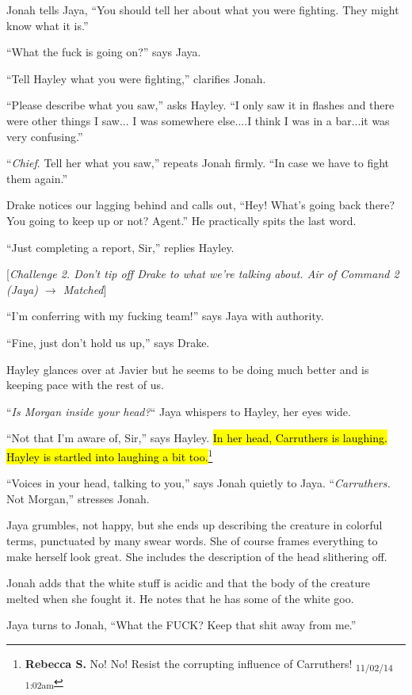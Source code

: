 Jonah tells Jaya, ``You should tell her about what you were fighting. They might know what it is.''

``What the fuck is going on?'' says Jaya.

``Tell Hayley what you were fighting,'' clarifies Jonah.

``Please describe what you saw,'' asks Hayley.  ``I only saw it in flashes and there were other things I saw... I was somewhere else....I think I was in a bar...it was very confusing.''

``\textit{Chief}.  Tell her what you saw,'' repeats Jonah firmly.  ``In case we have to fight them again.''

Drake notices our lagging behind and calls out, ``Hey! What's going back there?  You going to keep up or not?  Agent.''  He practically spits the last word.

``Just completing a report, Sir,'' replies Hayley.

{[}\textit{Challenge 2.  Don't tip off Drake to what we're talking about.  Air of Command 2 (Jaya) $\rightarrow$ Matched}{]}

``I'm conferring with my fucking team!'' says Jaya with authority.

``Fine, just don't hold us up,'' says Drake.

Hayley glances over at Javier but he seems to be doing much better and is keeping pace with the rest of us.

``\textit{Is Morgan inside your head?}`` Jaya whispers to Hayley, her eyes wide.

``Not that I'm aware of, Sir,'' says Hayley.  \hl{In her head, Carruthers is laughing.  Hayley is startled into laughing a bit too.}\footnote{\textbf{Rebecca S. }No! No! Resist the corrupting influence of Carruthers! \textsubscript{11/02/14 1:02am}}

``Voices in your head, talking to you,'' says Jonah quietly to Jaya.    ``\textit{Carruthers. } Not Morgan,'' stresses Jonah.

Jaya grumbles, not happy, but she ends up describing the creature in colorful terms, punctuated by many swear words.  She of course frames everything to make herself look great.  She includes the description of the head slithering off. 

Jonah adds that the white stuff is acidic and that the body of the creature melted when she fought it.  He notes that he has some of the white goo.

Jaya turns to Jonah, ``What the FUCK?  Keep that shit away from me.''

